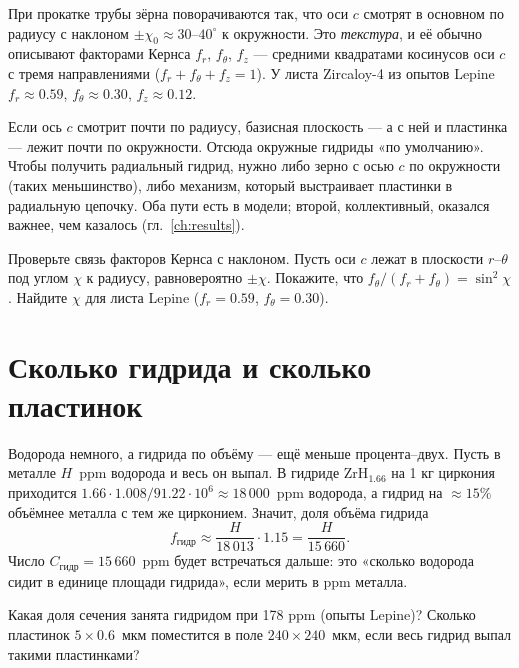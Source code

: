 При прокатке трубы зёрна поворачиваются так, что оси $c$ смотрят в основном по радиусу с наклоном
$\pm\chi_0\approx 30$--$40^\circ$ к окружности. Это \emph{текстура}, и её обычно описывают
факторами Кернса $f_r$, $f_\theta$, $f_z$ --- средними квадратами косинусов оси $c$ с тремя
направлениями ($f_r+f_\theta+f_z=1$). У листа Zircaloy-4 из опытов Lepine $f_r\approx0.59$,
$f_\theta\approx0.30$, $f_z\approx0.12$.

Если ось $c$ смотрит почти по радиусу, базисная плоскость --- а с ней и пластинка --- лежит почти
по окружности. Отсюда окружные гидриды «по умолчанию». Чтобы получить радиальный гидрид, нужно
либо зерно с осью $c$ по окружности (таких меньшинство), либо механизм, который выстраивает
пластинки в радиальную цепочку. Оба пути есть в модели; второй, коллективный, оказался
важнее, чем казалось (гл.~\ref{ch:results}).

\begin{exercise}
Проверьте связь факторов Кернса с наклоном. Пусть оси $c$ лежат в плоскости $r$--$\theta$ под
углом $\chi$ к радиусу, равновероятно $\pm\chi$. Покажите, что $f_\theta/(f_r+f_\theta)=\sin^2\chi$.
Найдите $\chi$ для листа Lepine ($f_r=0.59$, $f_\theta=0.30$).
\end{exercise}

\section{Сколько гидрида и сколько пластинок}

Водорода немного, а гидрида по объёму --- ещё меньше процента--двух. Пусть в металле $H$~ppm
водорода и весь он выпал. В гидриде ZrH$_{1.66}$ на 1 кг циркония приходится
$1.66\cdot1.008/91.22\cdot10^6\approx18\,000$~ppm водорода, а гидрид на $\approx15\%$ объёмнее
металла с тем же цирконием. Значит, доля объёма гидрида
\begin{equation}
f_{\text{гидр}}\approx\frac{H}{18\,013}\cdot1.15=\frac{H}{15\,660}.
\label{eq:frac}
\end{equation}
Число $C_{\text{гидр}}=15\,660$~ppm будет встречаться дальше: это «сколько водорода сидит в
единице площади гидрида», если мерить в ppm металла.

\begin{exercise}
Какая доля сечения занята гидридом при 178 ppm (опыты Lepine)? Сколько пластинок
$5\times0.6$~мкм поместится в поле $240\times240$~мкм, если весь гидрид выпал такими пластинками?
\end{exercise}

